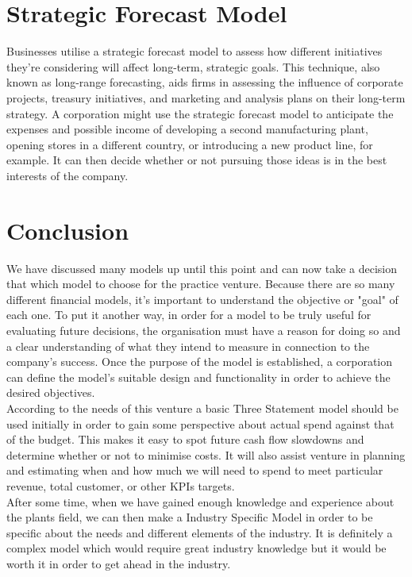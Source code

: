 \documentclass{article}
\begin{document}
\section{Strategic Forecast Model}
Businesses utilise a strategic forecast model to assess how different initiatives they're considering will affect long-term, strategic goals. This technique, also known as long-range forecasting, aids firms in assessing the influence of corporate projects, treasury initiatives, and marketing and analysis plans on their long-term strategy. A corporation might use the strategic forecast model to anticipate the expenses and possible income of developing a second manufacturing plant, opening stores in a different country, or introducing a new product line, for example. It can then decide whether or not pursuing those ideas is in the best interests of the company.

\section{Conclusion}
We have discussed many models up until this point and can now take a decision that which model to choose for the practice venture. 
Because there are so many different financial models, it's important to understand the objective or "goal" of each one. To put it another way, in order for a model to be truly useful for evaluating future decisions, the organisation must have a reason for doing so and a clear understanding of what they intend to measure in connection to the company's success. Once the purpose of the model is established, a corporation can define the model's suitable design and functionality in order to achieve the desired objectives.
\\
According to the needs of this venture a basic Three Statement model should be used initially in order to gain some perspective about actual spend against that of the budget.
This makes it easy to spot future cash flow slowdowns and determine whether or not to minimise costs. It will also assist venture in planning and estimating when and how much we will need to spend to meet particular revenue, total customer, or other KPIs targets.
\\
After some time, when we have gained enough knowledge and experience about the plants field, we can then make a Industry Specific Model in order to be specific about the needs and different elements of the industry. It is definitely a complex model which would require great industry knowledge but it would be worth it in order to get ahead in the industry.
\end{document}
